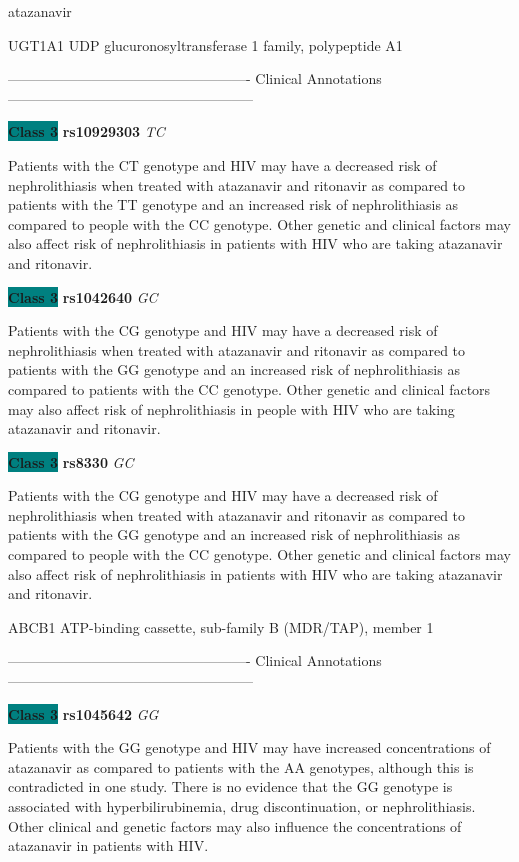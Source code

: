 \documentclass{resume} %
\begin{document}
\begin{rSection}{ atazanavir }
\begin{rSubsection}{ UGT1A1 }{ UDP glucuronosyltransferase 1 family, polypeptide A1 }{}{}
\item[] ---------------------------------------------------- Clinical Annotations -----------------------------------------------------\newline
\item \textbf{\colorbox{teal} {Class 3}} \textbf{ rs10929303 } \textit{ TC }
\item[] Patients with the CT genotype and HIV may have a decreased risk of nephrolithiasis when treated with atazanavir and ritonavir as compared to patients with the TT genotype and an increased risk of nephrolithiasis as compared to people with the CC genotype. Other genetic and clinical factors may also affect risk of nephrolithiasis in patients with HIV who are taking atazanavir and ritonavir. \item \textbf{\colorbox{teal} {Class 3}} \textbf{ rs1042640 } \textit{ GC }
\item[] Patients with the CG genotype and HIV may have a decreased risk of nephrolithiasis when treated with atazanavir and ritonavir as compared to patients with the GG genotype and an increased risk of nephrolithiasis as compared to patients with the CC genotype. Other genetic and clinical factors may also affect risk of nephrolithiasis in people with HIV who are taking atazanavir and ritonavir.\item \textbf{\colorbox{teal} {Class 3}} \textbf{ rs8330 } \textit{ GC }
\item[] Patients with the CG genotype and HIV may have a decreased risk of nephrolithiasis when treated with atazanavir and ritonavir as compared to patients with the GG genotype and an increased risk of nephrolithiasis as compared to people with the CC genotype. Other genetic and clinical factors may also affect risk of nephrolithiasis in patients with HIV who are taking atazanavir and ritonavir.
\end{rSubsection}\begin{rSubsection}{ ABCB1 }{ ATP-binding cassette, sub-family B (MDR/TAP), member 1 }{}{}
\item[]

\item[] ---------------------------------------------------- Clinical Annotations -----------------------------------------------------\newline
\item \textbf{\colorbox{teal} {Class 3}} \textbf{ rs1045642 } \textit{ GG }
\item[] Patients with the GG genotype and HIV may have increased concentrations of atazanavir as compared to patients with the AA genotypes, although this is contradicted in one study. There is no evidence that the GG genotype is associated with hyperbilirubinemia, drug discontinuation, or nephrolithiasis.  Other clinical and genetic factors may also influence the concentrations of atazanavir in patients with HIV. 
\end{rSubsection}


\end{rSection}
\end{document}
